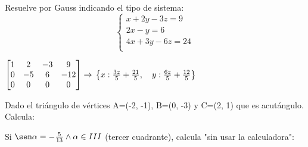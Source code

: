 \documentclass[addpoints,spanish, 12pt,a4paper]{exam}
\begin{document}
\begin{questions}
\begin{multicols}{2}
\begin{parts}
		        \end{parts}
		        \end{multicols}



\question[1] Resuelve por Gauss indicando el tipo de sistema:
 $$\left\{\begin{matrix}x + 2y - 3z = 9\\ 2x - y = 6\\ 4x + 3y - 6z = 24\\ \end{matrix}\right.$$
		 \begin{solution}   $\left[\begin{matrix}1 & 2 & -3 & 9\\0 & -5 & 6 & -12\\0 & 0 & 0 & 0\end{matrix}\right] \rightarrow  \\ \left \{ x : \frac{3 z}{5} + \frac{21}{5}, \quad y : \frac{6 z}{5} + \frac{12}{5}\right \} $   \end{solution}
		 
		 
		         \question[2] Dado el triángulo de vértices A=(-2, -1), B=(0, -3) y  C=(2, 1) que es acutángulo. Calcula:
        \begin{multicols}{1}
        \end{multicols}


        \question[2] Si $\sen\alpha=-\frac{5}{13} \land \alpha \in III$ (tercer cuadrante), calcula "sin usar la calculadora":
        \begin{multicols}{4}
\end{multicols}
\end{questions}
\end{document}

